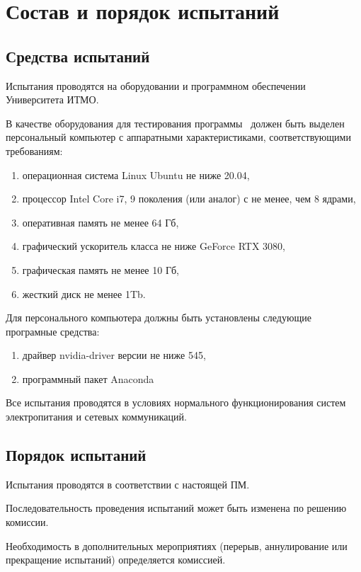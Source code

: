 \newpage
\section{Состав и порядок испытаний}

\subsection{Средства испытаний}

Испытания проводятся на оборудовании и программном обеспечении Университета ИТМО.

В качестве оборудования для тестирования программы \productname \ должен быть выделен персональный компьютер с аппаратными характеристиками, соответствующими требованиям:
\begin{enumerate}
    \item операционная система Linux Ubuntu не ниже 20.04,
    \item процессор Intel Core i7, 9 поколения (или аналог) с не менее, чем 8 ядрами,
    \item оперативная память не менее 64 Гб,
    \item графический ускоритель класса не ниже GeForce RTX 3080,
    \item графическая память не менее 10 Гб,
    \item жесткий диск не менее 1Tb.
\end{enumerate}

Для персонального компьютера должны быть установлены следующие програмные средства:
\begin{enumerate}
    \item драйвер nvidia-driver версии не ниже 545,
    \item программный пакет Anaconda
\end{enumerate}

Все испытания проводятся в условиях нормального функционирования систем электропитания и сетевых коммуникаций.


\subsection{Порядок испытаний}

Испытания проводятся в соответствии с настоящей ПМ.

Последовательность проведения испытаний может быть изменена по решению комиссии.

Необходимость в дополнительных мероприятиях (перерыв, аннулирование или прекращение испытаний) определяется комиссией.
